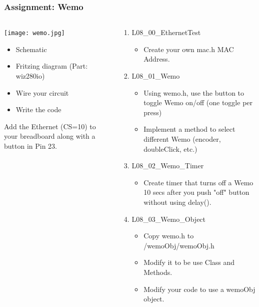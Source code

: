 \documentclass{beamer}
\begin{document}
\begin{frame}\frametitle{Assignment: Wemo}
\begin{columns}
\begin{column}{4.5cm}
\begin{center}
\texttt{[image: wemo.jpg]}
\end{center}
\begin{itemize}
\item Schematic
\item Fritzing diagram \newline (Part: wiz280io)
\item Wire your circuit
\item Write the code
\end{itemize}
Add the Ethernet (CS=10) to your breadboard along with a button in Pin 23. 
\end{column}
\begin{column}{8.0cm}
\begin{enumerate}
\item L08\_00\_EthernetTest
	\begin{itemize}
	\item Create your own mac.h MAC Address.
	\end{itemize}
\item L08\_01\_Wemo
	\begin{itemize}
	\item Using wemo.h, use the button to toggle Wemo on/off (one toggle per press)
	\item Implement a method to select different Wemo (encoder, doubleClick, etc.)
	\end{itemize}
\item L08\_02\_Wemo\_Timer
	\begin{itemize}
	\item Create timer that turns off a Wemo 10 secs after you push "off" button without using delay().
	\end{itemize}
\item L08\_03\_Wemo\_Object
	\begin{itemize}
	\item Copy wemo.h to /wemoObj/wemoObj.h 
	\item Modify it to be use Class and Methods.
	\item Modify your code to use a wemoObj object.
	\end{itemize}		
\end{enumerate}
\end{column}
\end{columns}
\end{frame}
\end{document}

